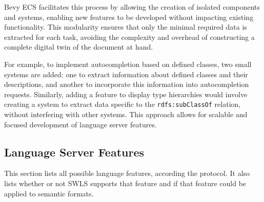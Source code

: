 Bevy ECS facilitates this process by allowing the creation of isolated components and systems, enabling new features to be developed without impacting existing functionality.
This modularity ensures that only the minimal required data is extracted for each task, avoiding the complexity and overhead of constructing a complete digital twin of the document at hand.

For example, to implement autocompletion based on defined classes, two small systems are added:
  one to extract information about defined classes and their descriptions,
  and another to incorporate this information into autocompletion requests. 
Similarly, adding a feature to display type hierarchies would involve creating a system to extract data specific to the \texttt{rdfs:subClassOf} relation, without interfering with other systems.
This approach allows for scalable and focused development of language server features.

\subsection{Language Server Features}

This section lists all possible language features, according the protocol.
It also lists whether or not SWLS supports that feature and if that feature could be applied to semantic formats.

